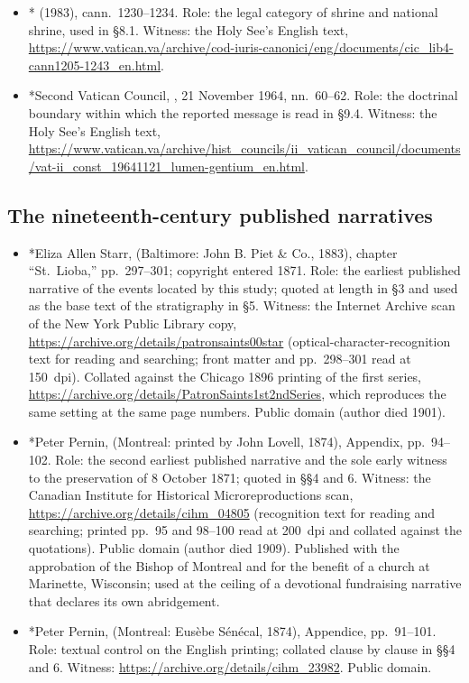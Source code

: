 \begin{itemize}
\url{https://www.vatican.va/roman_curia/congregations/cfaith/documents/rc_ddf_doc_20240517_norme-fenomeni-soprannaturali_en.html}.
\item * (1983), cann.~1230--1234. Role: the
legal category of shrine and national shrine, used in \S8.1. Witness:
the Holy See's English text,
\url{https://www.vatican.va/archive/cod-iuris-canonici/eng/documents/cic_lib4-cann1205-1243_en.html}.
\item *Second Vatican Council, , 21 November 1964,
nn.~60--62. Role: the doctrinal boundary within which the reported
message is read in \S9.4. Witness: the Holy See's English text,
\url{https://www.vatican.va/archive/hist_councils/ii_vatican_council/documents/vat-ii_const_19641121_lumen-gentium_en.html}.
\end{itemize}

\subsection*{The nineteenth-century published narratives}

\begin{itemize}
\item *Eliza Allen Starr,  (Baltimore: John B. Piet
\& Co., 1883), chapter ``St.~Lioba,'' pp.~297--301; copyright entered
1871. Role: the earliest published narrative of the events located by
this study; quoted at length in \S3 and used as the base text of the
stratigraphy in \S5. Witness: the Internet Archive scan of the New York
Public Library copy, \url{https://archive.org/details/patronsaints00star}
(optical-character-recognition text for reading and searching; front
matter and pp.~298--301 read at 150~dpi). Collated against the Chicago
1896 printing of the first series,
\url{https://archive.org/details/PatronSaints1st2ndSeries}, which
reproduces the same setting at the same page numbers. Public domain
(author died 1901).
\item *Peter Pernin,  (Montreal:
printed by John Lovell, 1874), Appendix, pp.~94--102. Role: the second
earliest published narrative and the sole early witness to the
preservation of 8 October 1871; quoted in \S\S4 and 6. Witness: the
Canadian Institute for Historical Microreproductions scan,
\url{https://archive.org/details/cihm_04805} (recognition text for
reading and searching; printed pp.~95 and 98--100 read at 200~dpi and
collated against the quotations). Public domain (author died 1909). Published with the approbation of the Bishop of Montreal
and for the benefit of a church at Marinette, Wisconsin; used at the
ceiling of a devotional fundraising narrative that declares its own
abridgement.
\item *Peter Pernin,  (Montreal: Eus\`ebe S\'en\'ecal, 1874), Appendice,
pp.~91--101. Role: textual control on the English printing; collated
clause by clause in \S\S4 and 6. Witness:
\url{https://archive.org/details/cihm_23982}. Public domain.
\end{itemize}

